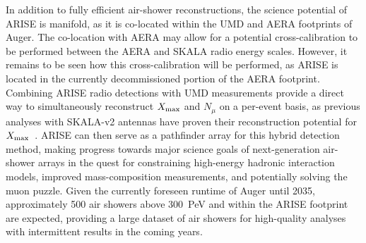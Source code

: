 

In addition to fully efficient air-shower reconstructions, the science potential of ARISE is manifold, as it is co-located within the UMD and AERA footprints of Auger.
The co-location with AERA may allow for a potential cross-calibration to be performed between the AERA and SKALA radio energy scales. 
However, it remains to be seen how this cross-calibration will be performed, as ARISE is located in the currently decommissioned portion of the AERA footprint.
Combining ARISE radio detections with UMD measurements provide a direct way to simultaneously reconstruct $X_{\rm max}$ and $N_{\mu}$ on a per-event basis, as previous analyses with SKALA-v2 antennas have proven their reconstruction potential for $X_{\rm max}$~\cite{icrc2023_turcotte}.
ARISE can then serve as a pathfinder array for this hybrid detection method, making progress towards major science goals of next-generation air-shower arrays in the quest for constraining high-energy hadronic interaction models, improved mass-composition measurements, and potentially solving the muon puzzle.
Given the currently foreseen runtime of Auger until 2035, approximately 500 air showers above \qty{300}{\peta\electronvolt} and within the ARISE footprint are expected, providing a large dataset of air showers for high-quality analyses with intermittent results in the coming years.






